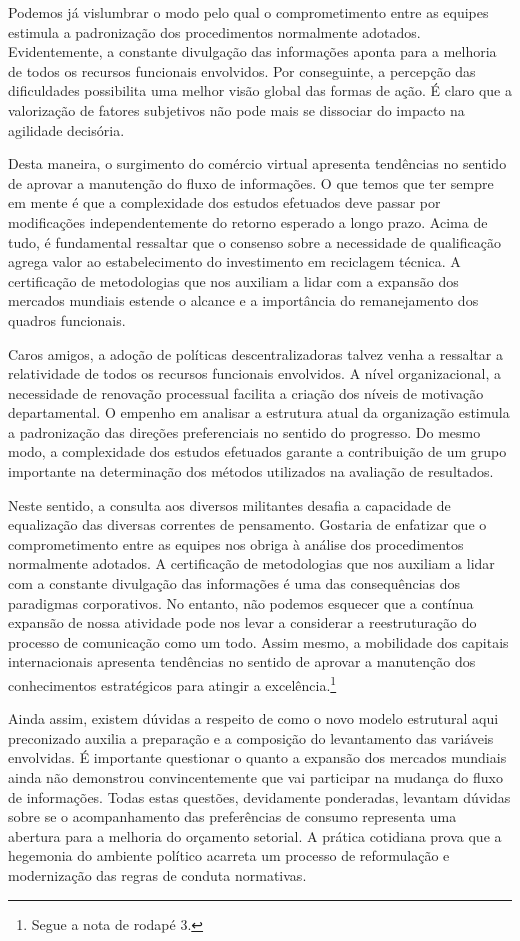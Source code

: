 \documentclass[10pt,a4paper,twoside]{article}
\begin{document}
	Podemos já vislumbrar o modo pelo qual o comprometimento entre as equipes estimula a padronização dos procedimentos normalmente adotados. Evidentemente, a constante divulgação das informações aponta para a melhoria de todos os recursos funcionais envolvidos. Por conseguinte, a percepção das dificuldades possibilita uma melhor visão global das formas de ação. É claro que a valorização de fatores subjetivos não pode mais se dissociar do impacto na agilidade decisória. 
	
	Desta maneira, o surgimento do comércio virtual apresenta tendências no sentido de aprovar a manutenção do fluxo de informações. O que temos que ter sempre em mente é que a complexidade dos estudos efetuados deve passar por modificações independentemente do retorno esperado a longo prazo. Acima de tudo, é fundamental ressaltar que o consenso sobre a necessidade de qualificação agrega valor ao estabelecimento do investimento em reciclagem técnica. A certificação de metodologias que nos auxiliam a lidar com a expansão dos mercados mundiais estende o alcance e a importância do remanejamento dos quadros funcionais. 
	
	Caros amigos, a adoção de políticas descentralizadoras talvez venha a ressaltar a relatividade de todos os recursos funcionais envolvidos. A nível organizacional, a necessidade de renovação processual facilita a criação dos níveis de motivação departamental. O empenho em analisar a estrutura atual da organização estimula a padronização das direções preferenciais no sentido do progresso. Do mesmo modo, a complexidade dos estudos efetuados garante a contribuição de um grupo importante na determinação dos métodos utilizados na avaliação de resultados. 
	
	Neste sentido, a consulta aos diversos militantes desafia a capacidade de equalização das diversas correntes de pensamento. Gostaria de enfatizar que o comprometimento entre as equipes nos obriga à análise dos procedimentos normalmente adotados. A certificação de metodologias que nos auxiliam a lidar com a constante divulgação das informações é uma das consequências dos paradigmas corporativos. No entanto, não podemos esquecer que a contínua expansão de nossa atividade pode nos levar a considerar a reestruturação do processo de comunicação como um todo. Assim mesmo, a mobilidade dos capitais internacionais apresenta tendências no sentido de aprovar a manutenção dos conhecimentos estratégicos para atingir a excelência.\footnote{Segue a nota de rodapé 3.}
	
	Ainda assim, existem dúvidas a respeito de como o novo modelo estrutural aqui preconizado auxilia a preparação e a composição do levantamento das variáveis envolvidas. É importante questionar o quanto a expansão dos mercados mundiais ainda não demonstrou convincentemente que vai participar na mudança do fluxo de informações. Todas estas questões, devidamente ponderadas, levantam dúvidas sobre se o acompanhamento das preferências de consumo representa uma abertura para a melhoria do orçamento setorial. A prática cotidiana prova que a hegemonia do ambiente político acarreta um processo de reformulação e modernização das regras de conduta normativas. 
	
\end{document}
